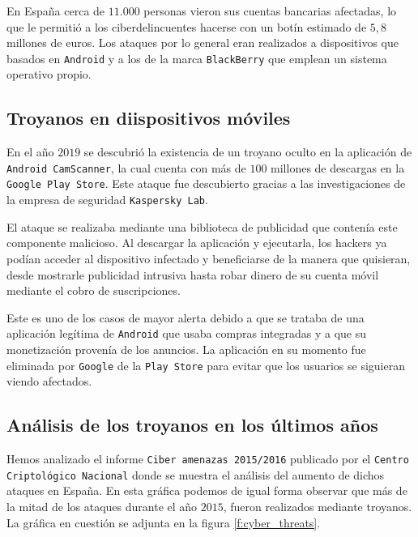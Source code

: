 \documentclass[12pt]{article}
\newcommand{\newpar} {
    \vskip 1cm
}
\begin{document}
            \newpar

            En España cerca de $11.000$ personas vieron sus cuentas bancarias afectadas, lo que le permitió a los ciberdelincuentes hacerse con un botín estimado de $5,8$ millones de euros. Los ataques por lo general eran realizados a dispositivos que basados en \texttt{Android} y a los de la marca \texttt{BlackBerry} que emplean un sistema operativo propio.

        \subsection{Troyanos en diispositivos móviles}
            En el año $2019$ se descubrió la existencia de un troyano oculto en la aplicación de \texttt{Android CamScanner}, la cual cuenta con más de $100$ millones de descargas en la \texttt{Google Play Store}. Este ataque fue descubierto gracias a las investigaciones de la empresa de seguridad \texttt{Kaspersky Lab}.

            \newpar

            El ataque se realizaba mediante una biblioteca de publicidad que contenía este componente malicioso. Al descargar la aplicación y ejecutarla, los hackers ya podían acceder al dispositivo infectado y beneficiarse de la manera que quisieran, desde mostrarle publicidad intrusiva hasta robar dinero de su cuenta móvil mediante el cobro de suscripciones.

            \newpar

            Este es uno de los casos de mayor alerta debido a que se trataba de una aplicación legítima de \texttt{Android} que usaba compras integradas y a que su monetización provenía de los anuncios. La aplicación en su momento fue eliminada por \texttt{Google} de la \texttt{Play Store} para evitar que los usuarios se siguieran viendo afectados.

        \subsection{Análisis de los troyanos en los últimos años}
            Hemos analizado el informe \texttt{Ciber amenazas 2015/2016} publicado por el \texttt{Centro Criptológico Nacional} donde se muestra el análisis del aumento de dichos ataques en España. En esta gráfica podemos de igual forma observar que más de la mitad de los ataques durante el año $2015$, fueron realizados mediante troyanos. La gráfica en cuestión se adjunta en la figura \ref{f:cyber_threats}.
\end{document}
